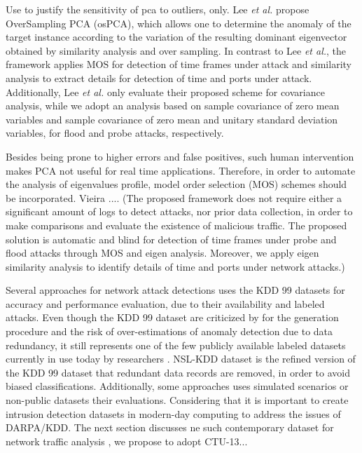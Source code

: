 \documentclass[review]{elsarticle}
\begin{document}
Use to justify the sensitivity of pca to outliers, only. Lee \emph{et al.} \cite{Lee2013} propose OverSampling PCA (osPCA), which allows one to determine the anomaly of the target instance according to the variation of the resulting dominant eigenvector obtained by similarity analysis and over sampling. In contrast to Lee \emph{et al.}, the framework applies MOS for detection of time frames under attack and similarity analysis to extract details for detection of time and ports under attack. Additionally, Lee \emph{et al.} only evaluate their proposed scheme for covariance analysis, while we adopt an analysis based on sample covariance of zero mean variables and sample covariance of zero mean and unitary standard deviation variables, for flood and probe attacks, respectively. 

Besides being prone to higher errors and false positives, such human intervention makes PCA not useful for real time applications. Therefore, in order to automate the analysis of eigenvalues profile, model order selection (MOS) schemes should be incorporated. Vieira .... (The proposed framework does not require either a significant amount of logs to detect attacks, nor prior data collection, in order to make comparisons and evaluate the existence of malicious traffic. The proposed solution is automatic and blind for detection of time frames under probe and flood attacks through MOS and eigen analysis. Moreover, we apply eigen similarity analysis to identify details of time and ports under network attacks.)

Several approaches for network attack detections uses the KDD 99 \cite{ji2016multi,ahmed2016survey,osanaiye2016distributed,bhuyan2014network} datasets for accuracy and performance evaluation, due to their availability and labeled attacks. Even though the KDD 99 dataset are criticized by for the generation procedure and the risk of over-estimations of anomaly detection due to data redundancy, it still represents one of the few publicly available labeled datasets currently in use today by researchers \cite{osanaiye2016distributed,bhuyan2014network}. NSL-KDD \cite{tavallaee2009detailed} dataset is the refined version of the KDD 99 dataset that redundant data records are removed, in order to avoid biased classifications. Additionally, some approaches uses simulated \cite{callegari2011novel} scenarios or non-public datasets their evaluations. Considering that it is important to create intrusion detection datasets in modern-day computing to address the issues of DARPA/KDD. The next section discusses ne such contemporary dataset for network traffic analysis \cite{ahmed2016survey}, we propose to adopt CTU-13...
\end{document}
